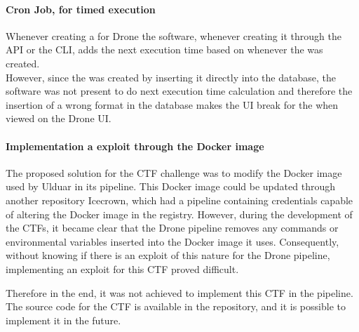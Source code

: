 \paragraph{Cron Job, for timed execution}
Whenever creating a  for Drone the software, whenever creating it through the API or the CLI,
adds the next execution time based on whenever the  was created.\\
However, since the  was created by inserting it directly into the database, 
the software was not present to do next execution time calculation and therefore the insertion of a wrong format in the database makes the 
UI break for the  when viewed on the Drone UI.
\paragraph{Implementation a exploit through the Docker image}
The proposed solution for the \ac{CTF} challenge was to modify the Docker image used by Ulduar in its pipeline. 
This Docker image could be updated through another repository Icecrown, 
which had a pipeline containing credentials capable of altering the Docker image in the registry.
However, during the development of the \ac{CTF}s, 
it became clear that the Drone pipeline removes any commands or environmental variables inserted into the Docker image it uses. 
Consequently, without knowing if there is an exploit of this nature for the Drone pipeline, implementing an exploit for this \ac{CTF} proved difficult.

Therefore in the end, it was not achieved to implement this \ac{CTF} in the pipeline. 
The source code for the \ac{CTF} is available in the repository, and it is possible to implement it in the future.

